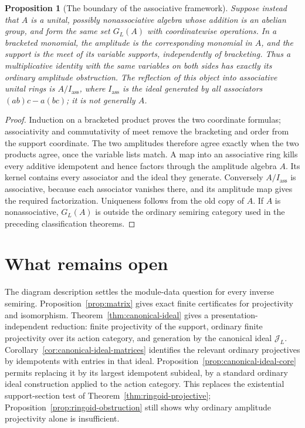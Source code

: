 \documentclass[11pt]{amsart}
\newtheorem{proposition}[theorem]{Proposition}
\theoremstyle{definition}
\theoremstyle{remark}
\begin{document}
\begin{proposition}[The boundary of the associative framework]
\label{prop:nonassociative-boundary}
Suppose instead that $A$ is a unital, possibly nonassociative algebra
whose addition is an abelian group, and form the same set $G_L(A)$ with
coordinatewise operations. In a bracketed monomial, the amplitude is
the corresponding monomial in $A$, and the support is the meet of its
variable supports, independently of bracketing. Thus a multiplicative
identity with the same variables on both sides has exactly its ordinary
amplitude obstruction. The reflection of this object into associative
unital rings is $A/I_{\mathrm{ass}}$, where $I_{\mathrm{ass}}$ is the ideal
generated by all associators $(ab)c-a(bc)$; it is not generally $A$.
\end{proposition}
\begin{proof}
Induction on a bracketed product proves the two coordinate formulas;
associativity and commutativity of meet remove the bracketing and order
from the support coordinate. The two amplitudes therefore agree exactly
when the two products agree, once the variable lists match. A map into
an associative ring kills every additive idempotent and hence factors
through the amplitude algebra $A$. Its kernel contains every associator
and the ideal they generate. Conversely $A/I_{\mathrm{ass}}$ is
associative, because each associator vanishes there, and its amplitude
map gives the required factorization. Uniqueness follows from the old
copy of $A$. If $A$ is nonassociative, $G_L(A)$ is outside the ordinary
semiring category used in the preceding classification theorems.
\end{proof}







\section{What remains open}
The diagram description settles the module-data question for every inverse semiring. Proposition~\ref{prop:matrix} gives exact finite certificates for projectivity and isomorphism. Theorem~\ref{thm:canonical-ideal} gives a presentation-independent reduction: finite projectivity of the support, ordinary finite projectivity over its action category, and generation by the canonical ideal $\mathcal J_L$. Corollary~\ref{cor:canonical-ideal-matrices} identifies the relevant ordinary projectives by idempotents with entries in that ideal. Proposition~\ref{prop:canonical-ideal-core} permits replacing it by its largest idempotent subideal, by a standard ordinary ideal construction applied to the action category. This replaces the existential support-section test of Theorem~\ref{thm:ringoid-projective}; Proposition~\ref{prop:ringoid-obstruction} still shows why ordinary amplitude projectivity alone is insufficient.
\end{document}
